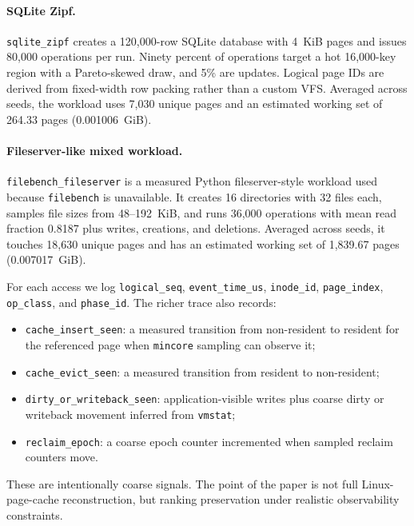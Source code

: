 \documentclass{article}
\begin{document}
\paragraph{SQLite Zipf.}
\texttt{sqlite\_zipf} creates a 120{,}000-row SQLite database with 4~KiB pages and issues 80{,}000 operations per run. Ninety percent of operations target a hot 16{,}000-key region with a Pareto-skewed draw, and 5\% are updates. Logical page IDs are derived from fixed-width row packing rather than a custom VFS. Averaged across seeds, the workload uses 7{,}030 unique pages and an estimated working set of 264.33 pages (0.001006~GiB).

\paragraph{Fileserver-like mixed workload.}
\texttt{filebench\_fileserver} is a measured Python fileserver-style workload used because \texttt{filebench} is unavailable. It creates 16 directories with 32 files each, samples file sizes from 48--192~KiB, and runs 36{,}000 operations with mean read fraction 0.8187 plus writes, creations, and deletions. Averaged across seeds, it touches 18{,}630 unique pages and has an estimated working set of 1{,}839.67 pages (0.007017~GiB).

For each access we log \texttt{logical\_seq}, \texttt{event\_time\_us}, \texttt{inode\_id}, \texttt{page\_index}, \texttt{op\_class}, and \texttt{phase\_id}. The richer trace also records:
\begin{itemize}
  \item \texttt{cache\_insert\_seen}: a measured transition from non-resident to resident for the referenced page when \texttt{mincore} sampling can observe it;
  \item \texttt{cache\_evict\_seen}: a measured transition from resident to non-resident;
  \item \texttt{dirty\_or\_writeback\_seen}: application-visible writes plus coarse dirty or writeback movement inferred from \texttt{vmstat};
  \item \texttt{reclaim\_epoch}: a coarse epoch counter incremented when sampled reclaim counters move.
\end{itemize}

These are intentionally coarse signals. The point of the paper is not full Linux-page-cache reconstruction, but ranking preservation under realistic observability constraints.
\end{document}
